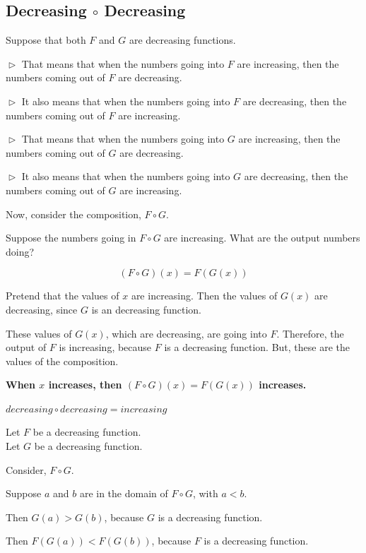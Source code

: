 \documentclass{ximera}
\begin{document}
\subsection*{Decreasing $\circ$ Decreasing}


Suppose that both $F$ and $G$ are decreasing functions. 

$\vartriangleright$ That means that when the numbers going into $F$ are increasing, then the numbers coming out of $F$ are decreasing. 


$\vartriangleright$ It also means that when the numbers going into $F$ are decreasing, then the numbers coming out of $F$ are increasing. 


$\vartriangleright$ That means that when the numbers going into $G$ are increasing, then the numbers coming out of $G$ are decreasing. 



$\vartriangleright$ It also means that when the numbers going into $G$ are decreasing, then the numbers coming out of $G$ are increasing. 


Now, consider the composition, $F \circ G$. 


Suppose the numbers going in $F \circ G$ are increasing.  What are the output numbers doing? 




\[ (F \circ G)(x) = F(G(x)) \]


Pretend that the values of $x$ are increasing. Then the values of $G(x)$ are decreasing, since $G$ is an decreasing function.

These values of $G(x)$, which are decreasing, are going into $F$.  Therefore, the output of $F$ is increasing, because $F$ is a decreasing function.  But, these are the values of the composition.



\begin{center}
\textbf{\textcolor{red!70!black}{When $x$ increases, then $(F \circ G)(x) = F(G(x))$ increases.}}
\end{center}






\begin{fact}
$decreasing \circ decreasing = increasing$


Let $F$ be a decreasing function. \\
Let $G$ be a decreasing function. 


Consider, $F \circ G$.

Suppose $a$ and $b$ are in the domain of $F \circ G$, with $a < b$. 

Then $G(a) > G(b)$, because $G$ is a decreasing function. 

Then $F(G(a)) < F(G(b))$, because $F$ is a decreasing function.


\end{fact}
\end{document}
